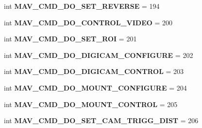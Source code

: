 \begin{DoxyCompactItemize}
\item 
\mbox{\label{namespacepymavlink_1_1dialects_1_1v10_aff0bdcdda5818ec727826d24b2a61474}} 
int {\bfseries M\+A\+V\+\_\+\+C\+M\+D\+\_\+\+D\+O\+\_\+\+S\+E\+T\+\_\+\+R\+E\+V\+E\+R\+SE} = 194
\item 
\mbox{\label{namespacepymavlink_1_1dialects_1_1v10_a450f6d2378bb665453e051b9d448b144}} 
int {\bfseries M\+A\+V\+\_\+\+C\+M\+D\+\_\+\+D\+O\+\_\+\+C\+O\+N\+T\+R\+O\+L\+\_\+\+V\+I\+D\+EO} = 200
\item 
\mbox{\label{namespacepymavlink_1_1dialects_1_1v10_afe476d224cd8dc4f1cdb8aeb846f6822}} 
int {\bfseries M\+A\+V\+\_\+\+C\+M\+D\+\_\+\+D\+O\+\_\+\+S\+E\+T\+\_\+\+R\+OI} = 201
\item 
\mbox{\label{namespacepymavlink_1_1dialects_1_1v10_a325d27be07f1049e54e4a48b06339f2a}} 
int {\bfseries M\+A\+V\+\_\+\+C\+M\+D\+\_\+\+D\+O\+\_\+\+D\+I\+G\+I\+C\+A\+M\+\_\+\+C\+O\+N\+F\+I\+G\+U\+RE} = 202
\item 
\mbox{\label{namespacepymavlink_1_1dialects_1_1v10_a52d5ff605612829c86c22a0990ddce2f}} 
int {\bfseries M\+A\+V\+\_\+\+C\+M\+D\+\_\+\+D\+O\+\_\+\+D\+I\+G\+I\+C\+A\+M\+\_\+\+C\+O\+N\+T\+R\+OL} = 203
\item 
\mbox{\label{namespacepymavlink_1_1dialects_1_1v10_ae29c23b5acaa11ace005803e00e6330a}} 
int {\bfseries M\+A\+V\+\_\+\+C\+M\+D\+\_\+\+D\+O\+\_\+\+M\+O\+U\+N\+T\+\_\+\+C\+O\+N\+F\+I\+G\+U\+RE} = 204
\item 
\mbox{\label{namespacepymavlink_1_1dialects_1_1v10_a9212b4d6b73373de1e01c7c21f96c793}} 
int {\bfseries M\+A\+V\+\_\+\+C\+M\+D\+\_\+\+D\+O\+\_\+\+M\+O\+U\+N\+T\+\_\+\+C\+O\+N\+T\+R\+OL} = 205
\item 
\mbox{\label{namespacepymavlink_1_1dialects_1_1v10_a4efe4b323cb7f1f274100ea4dccd7e39}} 
int {\bfseries M\+A\+V\+\_\+\+C\+M\+D\+\_\+\+D\+O\+\_\+\+S\+E\+T\+\_\+\+C\+A\+M\+\_\+\+T\+R\+I\+G\+G\+\_\+\+D\+I\+ST} = 206

\end{DoxyCompactItemize}
